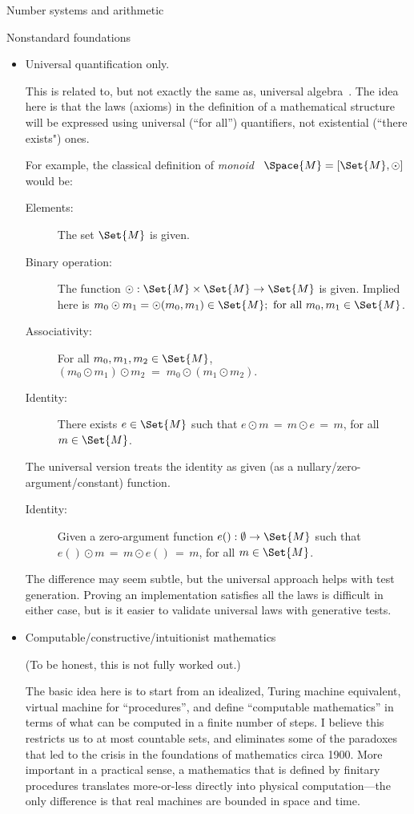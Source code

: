 \documentclass[12pt]{PalisadesLakesBook}
\begin{document}
\begin{plSection}{Number systems and arithmetic}
\begin{plSection}{Nonstandard foundations}
\begin{itemize}
\item Universal quantification only.

This is related to, but not exactly the same as,
universal algebra~\cite{wiki:UniversalAlgebra}.
The idea here is that the laws (axioms) 
in the definition of a mathematical structure
will be expressed using
universal (``for all'') quantifiers, 
not existential (``there exists") ones.

For example, the classical definition of 
\emph{monoid}~\cite{wiki:Monoid} $\Space{M} = [\Set{M}, \odot]$
would be:
\begin{description}
  \item[Elements:] The set $\Set{M}$ is given.
  \item[Binary operation:] The function
  $\odot : \Set{M} \times \Set{M} \rightarrow \Set{M}$ is given.
  Implied here is 
  $m_0 \odot m_1 = \odot(m_0,m_1) \in \Set{M};
  \text{ for all } m_0, m_1 \in \Set{M}$.
  \item[Associativity:] For all $m_0, m_1, m_2 \in \Set{M}$,
  $(m_0 \odot m_1) \odot m_2 \;=\; m_0 \odot (m_1 \odot m_2).$
  \item[Identity:] There exists $e \in \Set{M}$ such that
  $e \odot m \,=\, m \odot e \,=\, m$,
  for all $m \in \Set{M}$. 
\end{description}
The universal version treats the identity as given
(as a nullary/zero-argument/constant) function.
\begin{description}
  \item[Identity:] Given a zero-argument function 
  $e() : \emptyset \rightarrow \Set{M}$ such that
  $e() \odot m \,=\, m \odot e() \,=\, m$,
  for all $m \in \Set{M}$. 
\end{description}
The difference may seem subtle, but the universal approach
helps with test generation.
Proving an implementation satisfies all the laws is difficult 
in either case, but is it easier to validate
universal laws with generative tests.

\item Computable/constructive/intuitionist mathematics

(To be honest, this is not fully worked out.)

The basic idea here is to start from an
idealized, Turing machine equivalent,
virtual machine for ``procedures'', and define 
``computable mathematics'' in terms of what can be computed 
in a finite number of steps.
I believe this restricts us to at most countable sets,
and eliminates some of the paradoxes that led to the crisis
in the foundations of mathematics circa 1900.
More important in a practical sense, a mathematics that is
defined by finitary procedures translates more-or-less
directly into physical computation---the only difference is 
that real machines are bounded in space and time.


\end{itemize}
\end{plSection}
\end{plSection}
\end{document}
